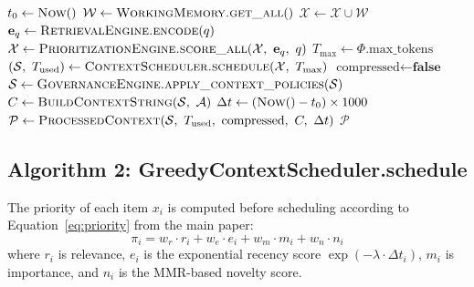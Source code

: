 \begin{algorithm}[h!]
\DontPrintSemicolon
\caption{ContextOrchestrator.process\_query}
\label{alg:orchestrator}
$t_0 \leftarrow \textsc{Now}()$\;
$\mathcal{W} \leftarrow \textsc{WorkingMemory.get\_all}()$\;
$\mathcal{X} \leftarrow \mathcal{X} \cup \mathcal{W}$\;
\BlankLine
{}
$\mathbf{e}_q \leftarrow \textsc{RetrievalEngine.encode}(q)$ \;
$\mathcal{X} \leftarrow \textsc{PrioritizationEngine.score\_all}(\mathcal{X},\ \mathbf{e}_q,\ q)$\;
\BlankLine
{}
$T_{\max} \leftarrow \Phi.\text{max\_tokens}$\;
$(\mathcal{S},\ T_{\text{used}}) \leftarrow \textsc{ContextScheduler.schedule}(\mathcal{X},\ T_{\max})$\;
\BlankLine
{}
$\text{compressed} \leftarrow \textbf{false}$\;
\BlankLine
{}
$\mathcal{S} \leftarrow \textsc{GovernanceEngine.apply\_context\_policies}(\mathcal{S})$\;
\BlankLine
{}
$C \leftarrow \textsc{BuildContextString}(\mathcal{S},\ \mathcal{A})$\;
$\Delta t \leftarrow (\textsc{Now}() - t_0) \times 1000$\;
$\mathcal{P} \leftarrow \textsc{ProcessedContext}(\mathcal{S},\ T_{\text{used}},\ \text{compressed},\ C,\ \Delta t)$\;
\Return $\mathcal{P}$\;
\end{algorithm}

\subsection{Algorithm 2: GreedyContextScheduler.schedule}

The priority of each item $x_i$ is computed before scheduling according to
Equation~\ref{eq:priority} from the main paper:
\begin{equation}
\pi_i = w_r \cdot r_i + w_e \cdot e_i + w_m \cdot m_i + w_n \cdot n_i
\label{eq:priority_app}
\end{equation}
where $r_i$ is relevance, $e_i$ is the exponential recency score
$\exp(-\lambda \cdot \Delta t_i)$, $m_i$ is importance, and $n_i$ is the
MMR-based novelty score.


